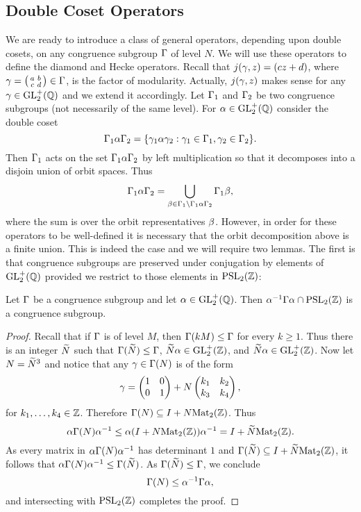     \subsection*{Double Coset Operators}
      We are ready to introduce a class of general operators, depending upon double cosets, on any congruence subgroup $\Gamma$ of level $N$. We will use these operators to define the diamond and Hecke operators. Recall that $j(\gamma,z) = (cz+d)$, where $\gamma = \begin{psmallmatrix} a & b \\ c & d \end{psmallmatrix} \in \Gamma$, is the factor of modularity. Actually, $j(\gamma,z)$ makes sense for any $\gamma \in \mathrm{GL}_{2}^{+}(\mathbb{Q})$ and we extend it accordingly. Let $\Gamma_{1}$ and $\Gamma_{2}$ be two congruence subgroups (not necessarily of the same level). For $\alpha \in \mathrm{GL}_{2}^{+}(\mathbb{Q})$ consider the double coset
      \[
        \Gamma_{1}\alpha\Gamma_{2} = \{\gamma_{1}\alpha\gamma_{2}:\gamma_{1} \in \Gamma_{1}, \gamma_{2} \in \Gamma_{2}\}.
      \]
      Then $\Gamma_{1}$ acts on the set $\Gamma_{1}\alpha\Gamma_{2}$ by left multiplication so that it decomposes into a disjoin union of orbit spaces. Thus
      \[
        \Gamma_{1}\alpha\Gamma_{2} = \bigcup_{\beta \in \Gamma_{1}\backslash\Gamma_{1}\alpha\Gamma_{2}}\Gamma_{1}\beta,
      \]
      where the sum is over the orbit representatives $\beta$. However, in order for these operators to be well-defined it is necessary that the orbit decomposition above is a finite union. This is indeed the case and we will require two lemmas. The first is that congruence subgroups are preserved under conjugation by elements of $\mathrm{GL}_{2}^{+}(\mathbb{Q})$ provided we restrict to those elements in $\mathrm{PSL}_{2}(\mathbb{Z})$:

      \begin{lemma}\label{lem:coset_lemma_1}
        Let $\Gamma$ be a congruence subgroup and let $\alpha \in \mathrm{GL}_{2}^{+}(\mathbb{Q})$. Then $\alpha^{-1}\Gamma\alpha \cap \mathrm{PSL}_{2}(\mathbb{Z})$ is a congruence subgroup.
      \end{lemma}
      \begin{proof}
        Recall that if $\Gamma$ is of level $M$, then $\Gamma(kM) \le \Gamma$ for every $k \ge 1$. Thus there is an integer $\widetilde{N}$ such that $\Gamma(\widetilde{N}) \le \Gamma$, $\widetilde{N}\alpha \in \mathrm{GL}_{2}^{+}(\mathbb{Z})$, and $\widetilde{N}\alpha \in \mathrm{GL}_{2}^{+}(\mathbb{Z})$. Now let $N = \widetilde{N}^{3}$ and notice that any $\gamma \in \Gamma(N)$ is of the form
        \[
          \gamma = \begin{pmatrix} 1 & 0 \\ 0 & 1 \end{pmatrix}+N\begin{pmatrix} k_{1} & k_{2} \\ k_{3} & k_{4} \end{pmatrix},
        \]
        for $k_{1},\ldots,k_{4} \in \mathbb{Z}$. Therefore $\Gamma(N) \subseteq I+N\mathrm{Mat}_{2}(\mathbb{Z})$. Thus
        \[
          \alpha\Gamma(N)\alpha^{-1} \le \alpha(I+N\mathrm{Mat}_{2}(\mathbb{Z}))\alpha^{-1} = I+\widetilde{N}\mathrm{Mat}_{2}(\mathbb{Z}).
        \]
        As every matrix in $\alpha\Gamma(N)\alpha^{-1}$ has determinant $1$ and $\Gamma(\widetilde{N}) \subseteq I+\widetilde{N}\mathrm{Mat}_{2}(\mathbb{Z})$, it follows that $\alpha\Gamma(N)\alpha^{-1} \le \Gamma(\widetilde{N})$. As $\Gamma(\widetilde{N}) \le \Gamma$, we conclude
        \[
          \Gamma(N) \le \alpha^{-1}\Gamma\alpha,
        \]
        and intersecting with $\mathrm{PSL}_{2}(\mathbb{Z})$ completes the proof.
      \end{proof}

